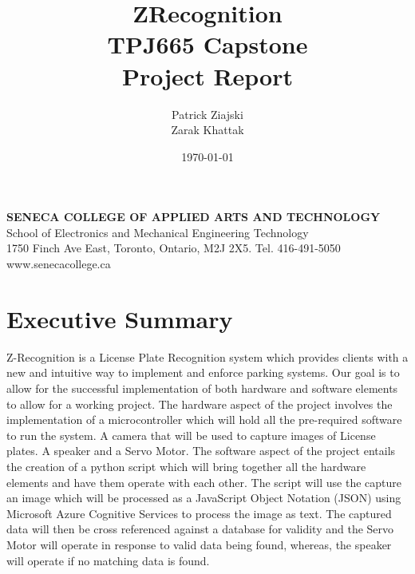 \documentclass[a4paper,12pt]{article}
\title{ZRecognition\\TPJ665 Capstone\\Project Report}
\author{Patrick Ziajski \\ Zarak Khattak}
\date{\today}
\begin{document}
\maketitle
\vfill
\begin{center}
    \textbf{SENECA COLLEGE OF APPLIED ARTS AND TECHNOLOGY}\\School of Electronics and Mechanical Engineering Technology\\1750 Finch Ave East, Toronto, Ontario, M2J 2X5. Tel. 416-491-5050\\www.senecacollege.ca
\end{center}
\thispagestyle{empty}

\newpage
\section{Executive Summary}
Z-Recognition is a License Plate Recognition system which provides clients with a new and intuitive way to implement and enforce parking systems. Our goal is to allow for the successful implementation of both hardware and software elements to allow for a working project.
The hardware aspect of the project involves the implementation of a microcontroller which will hold all the pre-required software to run the system. A camera that will be used to capture images of License plates. A speaker and a Servo Motor. 
The software aspect of the project entails the creation of a python script which will bring together all the hardware elements and have them operate with each other. The script will use the capture an image which will be processed as a JavaScript Object Notation (JSON) using Microsoft Azure Cognitive Services to process the image as text. The captured data will then be cross referenced against a database for validity and the Servo Motor will operate in response to valid data being found, whereas, the speaker will operate if no matching data is found.

\newpage
\tableofcontents
\newpage
\listoffigures
\listoftables

\newpage
{}
\end{document}
